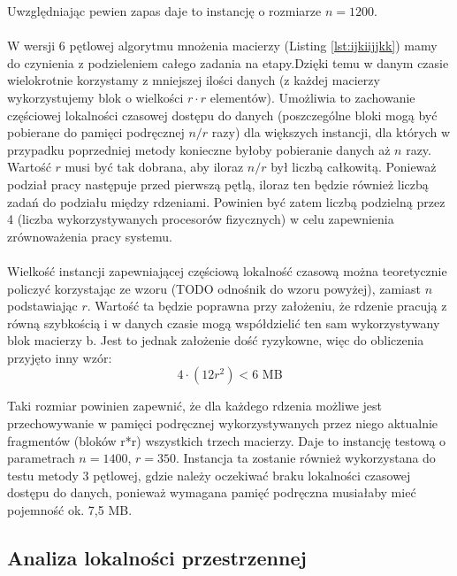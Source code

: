 \documentclass[12pt,a4paper]{article}
\begin{document}
Uwzględniając pewien zapas daje to instancję o rozmiarze $n=1200$.\\
\\

W wersji 6 pętlowej algorytmu mnożenia macierzy (Listing \ref{lst:ijkiijjkk}) mamy do czynienia z podzieleniem całego zadania na etapy.Dzięki temu w danym czasie wielokrotnie korzystamy z mniejszej ilości danych (z każdej macierzy wykorzystujemy blok o wielkości $r \cdot r$ elementów). Umożliwia to zachowanie częściowej lokalności czasowej dostępu do danych (poszczególne bloki mogą być pobierane do pamięci podręcznej $n / r$ razy) dla większych instancji, dla których w przypadku poprzedniej metody konieczne byłoby pobieranie danych aż $n$ razy. Wartość $r$ musi być tak dobrana, aby iloraz $n/r$ był liczbą całkowitą. Ponieważ podział pracy następuje przed pierwszą pętlą, iloraz ten będzie również liczbą zadań do podziału między rdzeniami. Powinien być zatem liczbą podzielną przez 4 (liczba wykorzystywanych procesorów fizycznych) w celu zapewnienia zrównoważenia pracy systemu.\\
\\
Wielkość instancji zapewniającej częściową lokalność czasową można teoretycznie policzyć korzystając ze wzoru (TODO odnośnik do wzoru powyżej), zamiast $n$ podstawiając $r$. Wartość ta będzie poprawna przy założeniu, że rdzenie pracują z równą szybkością i w danych czasie mogą współdzielić ten sam wykorzystywany blok macierzy b. Jest to jednak założenie dość ryzykowne, więc do obliczenia przyjęto inny wzór: 
\begin{equation}
4 \cdot \left( 12r^2 \right) < 6 \text{ MB}
\end{equation}

Taki rozmiar powinien zapewnić, że dla każdego rdzenia możliwe jest przechowywanie w pamięci podręcznej wykorzystywanych przez niego aktualnie fragmentów (bloków r*r) wszystkich trzech macierzy. Daje to instancję testową o parametrach $n=1400$, $r=350$. Instancja ta zostanie również wykorzystana do testu metody 3 pętlowej, gdzie należy oczekiwać braku lokalności czasowej dostępu do danych, ponieważ wymagana pamięć podręczna musiałaby mieć pojemność ok. 7,5 MB.


\subsection{Analiza lokalności przestrzennej}
\end{document}

